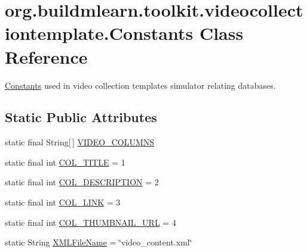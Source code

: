 \hypertarget{classorg_1_1buildmlearn_1_1toolkit_1_1videocollectiontemplate_1_1Constants}{}\section{org.\+buildmlearn.\+toolkit.\+videocollectiontemplate.\+Constants Class Reference}
\label{classorg_1_1buildmlearn_1_1toolkit_1_1videocollectiontemplate_1_1Constants}


\hyperlink{classorg_1_1buildmlearn_1_1toolkit_1_1videocollectiontemplate_1_1Constants}{Constants} used in video collection template\textquotesingle{}s simulator relating databases.  


\subsection*{Static Public Attributes}
\begin{DoxyCompactItemize}
\item 
static final String\mbox{[}$\,$\mbox{]} \hyperlink{classorg_1_1buildmlearn_1_1toolkit_1_1videocollectiontemplate_1_1Constants_a8b67a158639433cf19c0cfb64e6d0604}{V\+I\+D\+E\+O\+\_\+\+C\+O\+L\+U\+M\+NS}
\item 
static final int \hyperlink{classorg_1_1buildmlearn_1_1toolkit_1_1videocollectiontemplate_1_1Constants_a1ce807b88fd23ea492c6d8474f7a628c}{C\+O\+L\+\_\+\+T\+I\+T\+LE} = 1
\item 
static final int \hyperlink{classorg_1_1buildmlearn_1_1toolkit_1_1videocollectiontemplate_1_1Constants_ab99a58b66e8f89f8cd45bb84220ed883}{C\+O\+L\+\_\+\+D\+E\+S\+C\+R\+I\+P\+T\+I\+ON} = 2
\item 
static final int \hyperlink{classorg_1_1buildmlearn_1_1toolkit_1_1videocollectiontemplate_1_1Constants_aaf3c151a1398676cd47bf4ea743b5ab3}{C\+O\+L\+\_\+\+L\+I\+NK} = 3
\item 
static final int \hyperlink{classorg_1_1buildmlearn_1_1toolkit_1_1videocollectiontemplate_1_1Constants_adac1254615d4856c5a6a4c7483dbf46e}{C\+O\+L\+\_\+\+T\+H\+U\+M\+B\+N\+A\+I\+L\+\_\+\+U\+RL} = 4
\item 
static String \hyperlink{classorg_1_1buildmlearn_1_1toolkit_1_1videocollectiontemplate_1_1Constants_a6ca0b8cc526afb21e3896ef3231f0619}{X\+M\+L\+File\+Name} = \char`\"{}video\+\_\+content.\+xml\char`\"{}
\end{DoxyCompactItemize}


